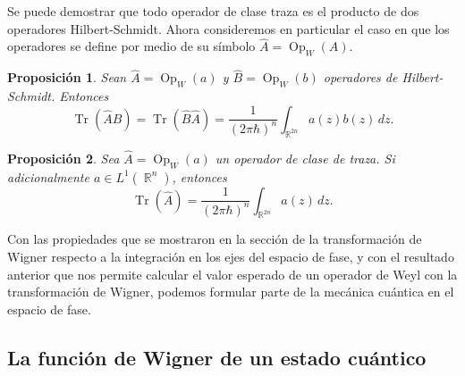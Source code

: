 \documentclass[a4paper]{report}
\DeclareMathOperator{\R}{\mathbb{R}}
\DeclareMathOperator{\Tr}{Tr}
\DeclareMathOperator{\Op}{Op}
\newtheorem{proposition}{Proposición}
\begin{document}
  Se puede demostrar que todo operador de clase traza es el
  producto de dos operadores Hilbert-Schmidt. Ahora
  consideremos en particular el caso en que los operadores
  se define por medio de su símbolo $\hat{A} = \Op_W(A)$.
  \begin{proposition}
    Sean $\hat{A} = \Op_W(a)$ y $\hat{B} = \Op_W(b)$
    operadores de Hilbert-Schmidt. Entonces
    \begin{equation}
      \Tr\left( \hat{A}\hat{B} \right) 
      = \Tr\left( \hat{B}\hat{A} \right) 
      = \frac{1}{(2\pi\hbar)^{n}} \int_{\R^{2n}} a(z)b(z) \,
      dz.
    \end{equation}
  \end{proposition}
  \begin{proposition}
    Sea $\hat{A} = \Op_W(a)$ un operador de clase de traza.
    Si adicionalmente $a \in L^{1}(\R^{n})$, entonces
    \begin{equation}
      \Tr\left( \hat{A} \right) 
      = \frac{1}{(2\pi\hbar)^{n}} \int_{\R^{2n}} a(z) \, dz.
    \end{equation}
  \end{proposition}

  Con las propiedades que se mostraron en la sección de la
  transformación de Wigner respecto a la integración en los
  ejes del espacio de fase, y con el resultado anterior que
  nos permite calcular el valor esperado de un operador de
  Weyl con la transformación de Wigner, podemos formular
  parte de la mecánica cuántica en el espacio de fase.

  \subsection{La función de Wigner de un estado cuántico}
\end{document}
